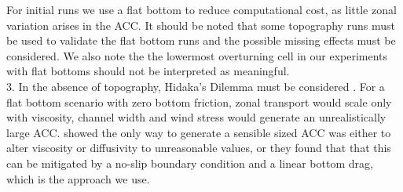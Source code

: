 For initial runs we use a flat bottom to reduce computational cost, as little zonal variation arises in the ACC. It should be noted that some topography runs must be used to validate the flat bottom runs and the possible missing effects must be considered. We also note the the lowermost overturning cell in our experiments with flat bottoms should not be interpreted as meaningful.  \\
3. In the absence of topography, Hidaka's Dilemma must be considered  \citep{hidaka1953}. For a flat bottom  scenario with zero bottom friction, zonal transport would scale only with viscosity, channel width and wind stress would generate an unrealistically large ACC. \citet{hidaka1953} showed the only way to generate a sensible sized ACC was either to alter viscosity or diffusivity to unreasonable values, or they found that that this can be mitigated by a no-slip boundary condition and a linear bottom drag, which is the approach we use. \\
